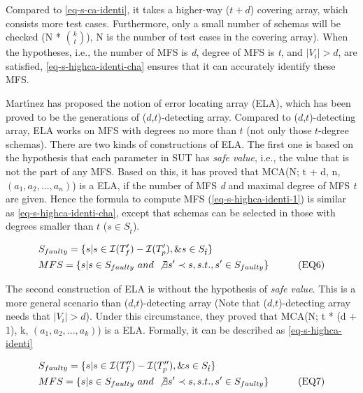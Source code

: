 \documentclass[10pt,journal,cspaper,compsoc]{IEEEtran}
\begin{document}
Compared to \ref{eq-s-ca-identi}, it takes a higher-way ($t+d$) covering array, which consists more test cases. Furthermore,  only a small number of schemas will be checked  (N * $ \binom{k}{t}$), N is the number of test cases in the covering array). When the hypotheses, i.e., the number of MFS is \emph{d}, degree of MFS is \emph{t}, and $|V_{i}| > d$, are satisfied, \ref{eq-s-highca-identi-cha} ensures that it can accurately identify these MFS.



Mart{\'\i}nez \cite{martinez2008algorithms,martinez2009locating} has proposed the notion of error locating array (ELA), which has been proved to be the generations of ($d$,$t$)-detecting array. Compared to ($d$,$t$)-detecting array, ELA works on MFS with degrees no more than $t$ (not only those $t$-degree schemas).  There are two kinds of constructions of ELA. The first one is based on the hypothesis that each parameter in SUT has \emph{safe value}, i.e., the value that is not the part of any MFS. Based on this, it has proved that MCA(N; t + d, n, $(a_{1}, a_{2}, ..., a_{n})$) is a ELA, if the number of MFS \emph{d} and maximal degree of MFS \emph{t} are given. Hence the formula to compute MFS (\ref{eq-s-highca-identi-1}) is similar as \ref{eq-s-highca-identi-cha}, except that schemas can be selected in those with degrees smaller than $t$ ($s \in S_{\hat{t}}$).

\begin{alignat}{2}
&  S_{faulty} = \{ s | s \in \mathcal{I}(T_{f}') - \mathcal{I}(T_{p}'), \& s \in S_{\hat{t}}  \}  &{}&   \nonumber \\
& MFS =  \{s | s \in S_{faulty}\ and\ \not\exists s' \prec s, s.t., s' \in S_{faulty}\} &{}& \tag{EQ6} \label{eq-s-highca-identi-1} \nonumber
\end{alignat}

The second construction of ELA is without the hypothesis of \emph{safe value}. This is a more general scenario than ($d$,$t$)-detecting array (Note that ($d$,$t$)-detecting array needs that $|V_{i}| > d$). Under this circumstance, they proved that MCA(N; t * (d + 1), k, $(a_{1}, a_{2}, ..., a_{k})$) is a ELA. Formally, it can be described as \ref{eq-s-highca-identi}


\begin{alignat}{2}
 &  S_{faulty} = \{ s | s \in \mathcal{I}(T_{f}'') - \mathcal{I}(T_{p}''), \& s \in S_{\hat{t}}  \}  &{}&   \nonumber \\
& MFS =  \{s | s \in S_{faulty}\ and\ \not\exists s' \prec s, s.t., s' \in S_{faulty}\} &{}& \tag{EQ7} \label{eq-s-highca-identi} \nonumber
\end{alignat}
\end{document}

